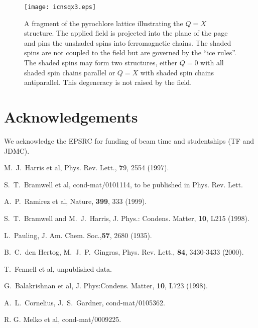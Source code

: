 \documentclass[global,twocolumn]{svjour}
\begin{document}
\begin{figure}
\texttt{[image: icnsqx3.eps]}
\caption{A fragment of the pyrochlore lattice illustrating the $Q=X$ structure.  The applied field is projected into the plane of the page and pins the unshaded spins into ferromagnetic chains.  The shaded spins are not coupled to the field but are governed by the ``ice rules''.  The shaded spins may form two structures, either $Q=0$ with all shaded spin chains parallel or $Q=X$ with shaded spin chains antiparallel.  This degeneracy is not raised by the field.}
\label{xstr}
\end{figure}

\section{Acknowledgements}
\label{ack}
We acknowledge the EPSRC for funding of beam time and studentships (TF 
and JDMC).

\begin{thebibliography}{} 

 M.~J.~Harris et al,
Phys. Rev. Lett., {\textbf 79}, 2554 (1997).

 S.~T.~Bramwell et al, cond-mat/0101114, to be 
published in Phys. Rev. Lett.

 A.~P.~Ramirez et al,
Nature, {\bf 399}, 333 (1999).

 S.~T.~Bramwell and M.~J.~Harris,
J. Phys.: Condens. Matter, {\bf 10}, L215 (1998).

 L.~Pauling, J. Am. Chem. Soc.,{\bf 57}, 2680 (1935).

 B.~C.~den Hertog, M.~J.~P.~Gingras,
Phys. Rev. Lett., {\bf 84}, 3430-3433 (2000).

 T.~Fennell et al, unpublished data.

  G.~Balakrishnan et al, J. Phys:Condens. Matter,
{\bf 10}, L723 (1998).

 A.~L.~Cornelius, J.~S.~Gardner, cond-mat/0105362.

 R. G. Melko et al, cond-mat/0009225.

\end{thebibliography}
\end{document}

